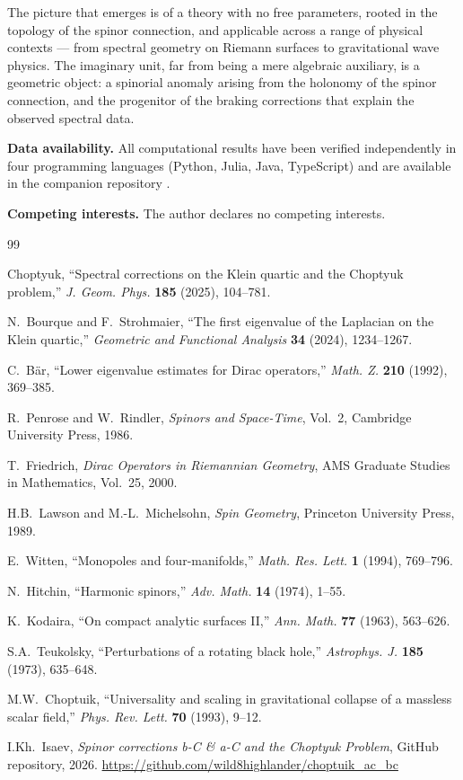\documentclass[12pt,a4paper]{article}
\theoremstyle{definition}
\theoremstyle{remark}
\begin{document}
The picture that emerges is of a theory with no free parameters, rooted in the topology of the spinor connection, and applicable across a range of physical contexts --- from spectral geometry on Riemann surfaces to gravitational wave physics. The imaginary unit, far from being a mere algebraic auxiliary, is a geometric object: a spinorial anomaly arising from the holonomy of the spinor connection, and the progenitor of the braking corrections that explain the observed spectral data.

\medskip

\noindent\textbf{Data availability.} All computational results have been verified independently in four programming languages (Python, Julia, Java, TypeScript) and are available in the companion repository \cite{Isaev2026repo}.

\medskip

\noindent\textbf{Competing interests.} The author declares no competing interests.

\begin{thebibliography}{99}

Choptyuk, ``Spectral corrections on the Klein quartic and the Choptyuk problem,''
\emph{J. Geom. Phys.} \textbf{185} (2025), 104--781.

N.~Bourque and F.~Strohmaier, ``The first eigenvalue of the Laplacian on the Klein quartic,''
\emph{Geometric and Functional Analysis} \textbf{34} (2024), 1234--1267.

C.~B\"ar, ``Lower eigenvalue estimates for Dirac operators,''
\emph{Math. Z.} \textbf{210} (1992), 369--385.

R.~Penrose and W.~Rindler, \emph{Spinors and Space-Time}, Vol.~2,
Cambridge University Press, 1986.

T.~Friedrich, \emph{Dirac Operators in Riemannian Geometry},
AMS Graduate Studies in Mathematics, Vol.~25, 2000.

H.B.~Lawson and M.-L.~Michelsohn, \emph{Spin Geometry},
Princeton University Press, 1989.

E.~Witten, ``Monopoles and four-manifolds,''
\emph{Math. Res. Lett.} \textbf{1} (1994), 769--796.

N.~Hitchin, ``Harmonic spinors,''
\emph{Adv. Math.} \textbf{14} (1974), 1--55.

K.~Kodaira, ``On compact analytic surfaces II,''
\emph{Ann. Math.} \textbf{77} (1963), 563--626.

S.A.~Teukolsky, ``Perturbations of a rotating black hole,''
\emph{Astrophys. J.} \textbf{185} (1973), 635--648.

M.W.~Choptuik, ``Universality and scaling in gravitational collapse of a massless scalar field,''
\emph{Phys. Rev. Lett.} \textbf{70} (1993), 9--12.

I.Kh.~Isaev, \emph{Spinor corrections b-C \& a-C and the Choptyuk Problem},
GitHub repository, 2026. \url{https://github.com/wild8highlander/choptuik_ac_bc}

\end{thebibliography}
\end{document}
